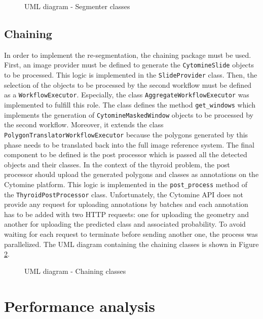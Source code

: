 \begin{figure}
	\center
	\caption{UML diagram - Segmenter classes}
	\label{fig:uml_cyto_segmenters}
\end{figure}

\subsection{Chaining}

In order to implement the re-segmentation, the chaining package must be used. First, an image provider must be defined to generate the \texttt{CytomineSlide} objects to be processed. This logic is implemented in the \texttt{SlideProvider} class. Then, the selection of the objects to be processed by the second workflow must be defined as a \texttt{WorkflowExecutor}. Especially, the class \texttt{AggregateWorkflowExecutor} was implemented to fulfill this role. The class defines the method \texttt{get\_windows} which implements the generation of \texttt{CytomineMaskedWindow} objects to be processed by the second workflow. Moreover, it extends the class \texttt{PolygonTranslatorWorkflowExecutor} because the polygons generated by this phase needs to be translated back into the full image reference system. The final component to be defined is the post processor which is passed all the detected objects and their classes. In the context of the thyroid problem, the post processor should upload the generated polygons and classes as annotations on the Cytomine platform. This logic is implemented in the \texttt{post\_process} method of the \texttt{ThyroidPostProcessor} class. Unfortunately, the Cytomine API does not provide any request for uploading annotations by batches and each annotation has to be added with two HTTP requests: one for uploading the geometry and another for uploading the predicted class and associated probability. To avoid waiting for each request to terminate before sending another one, the process was parallelized. The UML diagram containing the chaining classes is shown in Figure \ref{fig:uml_cyto_chaining}.


\begin{figure}
	\center
	\caption{UML diagram - Chaining classes}
	\label{fig:uml_cyto_chaining}
\end{figure}


\section{Performance analysis}
\label{sec:thyroid_perf}

